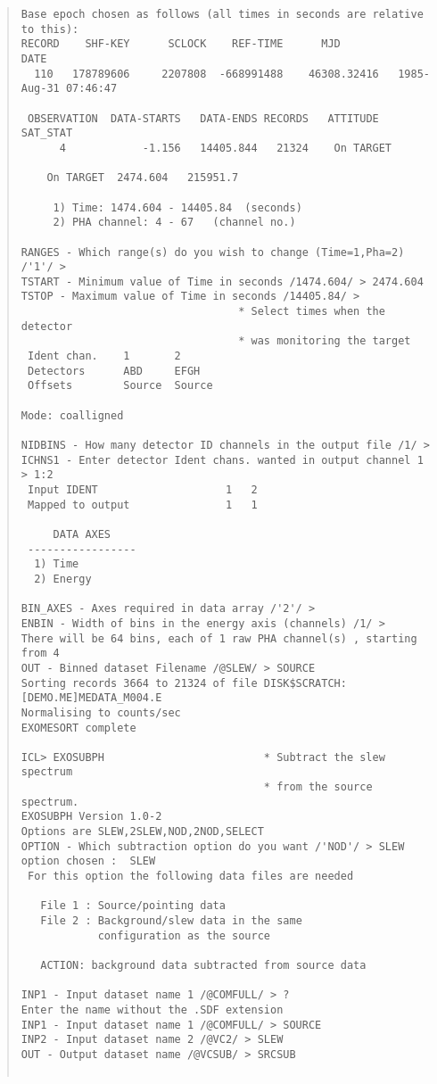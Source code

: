 \begin{quote}
\begin{verbatim}
Base epoch chosen as follows (all times in seconds are relative to this):
RECORD    SHF-KEY      SCLOCK    REF-TIME      MJD                 DATE
  110   178789606     2207808  -668991488    46308.32416   1985-Aug-31 07:46:47

 OBSERVATION  DATA-STARTS   DATA-ENDS RECORDS   ATTITUDE    SAT_STAT
      4            -1.156   14405.844   21324    On TARGET

    On TARGET  2474.604   215951.7

     1) Time: 1474.604 - 14405.84  (seconds)
     2) PHA channel: 4 - 67   (channel no.)

RANGES - Which range(s) do you wish to change (Time=1,Pha=2) /'1'/ > 
TSTART - Minimum value of Time in seconds /1474.604/ > 2474.604
TSTOP - Maximum value of Time in seconds /14405.84/ > 
                                  * Select times when the detector
                                  * was monitoring the target
 Ident chan.    1       2
 Detectors      ABD     EFGH
 Offsets        Source  Source

Mode: coalligned

NIDBINS - How many detector ID channels in the output file /1/ > 
ICHNS1 - Enter detector Ident chans. wanted in output channel 1 > 1:2
 Input IDENT                    1   2
 Mapped to output               1   1

     DATA AXES
 -----------------
  1) Time
  2) Energy

BIN_AXES - Axes required in data array /'2'/ > 
ENBIN - Width of bins in the energy axis (channels) /1/ > 
There will be 64 bins, each of 1 raw PHA channel(s) , starting from 4
OUT - Binned dataset Filename /@SLEW/ > SOURCE
Sorting records 3664 to 21324 of file DISK$SCRATCH:[DEMO.ME]MEDATA_M004.E
Normalising to counts/sec
EXOMESORT complete

ICL> EXOSUBPH                         * Subtract the slew spectrum 
                                      * from the source spectrum.
EXOSUBPH Version 1.0-2
Options are SLEW,2SLEW,NOD,2NOD,SELECT
OPTION - Which subtraction option do you want /'NOD'/ > SLEW
option chosen :  SLEW
 For this option the following data files are needed

   File 1 : Source/pointing data
   File 2 : Background/slew data in the same
            configuration as the source

   ACTION: background data subtracted from source data

INP1 - Input dataset name 1 /@COMFULL/ > ?
Enter the name without the .SDF extension 
INP1 - Input dataset name 1 /@COMFULL/ > SOURCE
INP2 - Input dataset name 2 /@VC2/ > SLEW
OUT - Output dataset name /@VCSUB/ > SRCSUB


\end{verbatim}
\end{quote}
